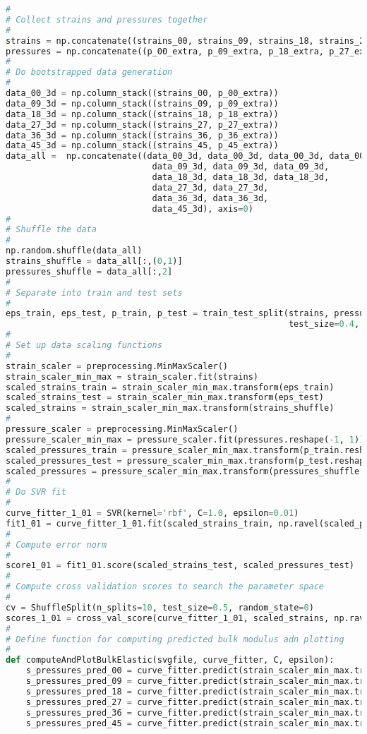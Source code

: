 \begin{lstlisting}[language=Python]
# 
# Collect strains and pressures together
#
strains = np.concatenate((strains_00, strains_09, strains_18, strains_27, strains_36, strains_45), axis=0)
pressures = np.concatenate((p_00_extra, p_09_extra, p_18_extra, p_27_extra, p_36_extra, p_45_extra), axis=0)
#
# Do bootstrapped data generation
#
data_00_3d = np.column_stack((strains_00, p_00_extra))
data_09_3d = np.column_stack((strains_09, p_09_extra))
data_18_3d = np.column_stack((strains_18, p_18_extra))
data_27_3d = np.column_stack((strains_27, p_27_extra))
data_36_3d = np.column_stack((strains_36, p_36_extra))
data_45_3d = np.column_stack((strains_45, p_45_extra))
data_all =  np.concatenate((data_00_3d, data_00_3d, data_00_3d, data_00_3d, 
                             data_09_3d, data_09_3d, data_09_3d, 
                             data_18_3d, data_18_3d, data_18_3d, 
                             data_27_3d, data_27_3d, 
                             data_36_3d, data_36_3d, 
                             data_45_3d), axis=0)          
#
# Shuffle the data
#
np.random.shuffle(data_all)
strains_shuffle = data_all[:,(0,1)]
pressures_shuffle = data_all[:,2]
#
# Separate into train and test sets
#
eps_train, eps_test, p_train, p_test = train_test_split(strains, pressures, 
                                                        test_size=0.4, random_state=0)
#
# Set up data scaling functions
#
strain_scaler = preprocessing.MinMaxScaler()
strain_scaler_min_max = strain_scaler.fit(strains)
scaled_strains_train = strain_scaler_min_max.transform(eps_train)
scaled_strains_test = strain_scaler_min_max.transform(eps_test)
scaled_strains = strain_scaler_min_max.transform(strains_shuffle)
#
pressure_scaler = preprocessing.MinMaxScaler()
pressure_scaler_min_max = pressure_scaler.fit(pressures.reshape(-1, 1))
scaled_pressures_train = pressure_scaler_min_max.transform(p_train.reshape(-1, 1))
scaled_pressures_test = pressure_scaler_min_max.transform(p_test.reshape(-1, 1))
scaled_pressures = pressure_scaler_min_max.transform(pressures_shuffle.reshape(-1, 1))
#
# Do SVR fit
#
curve_fitter_1_01 = SVR(kernel='rbf', C=1.0, epsilon=0.01)
fit1_01 = curve_fitter_1_01.fit(scaled_strains_train, np.ravel(scaled_pressures_train))
#
# Compute error norm
#
score1_01 = fit1_01.score(scaled_strains_test, scaled_pressures_test)
#
# Compute cross validation scores to search the parameter space
#
cv = ShuffleSplit(n_splits=10, test_size=0.5, random_state=0)
scores_1_01 = cross_val_score(curve_fitter_1_01, scaled_strains, np.ravel(scaled_pressures), cv=cv)
#
# Define function for computing predicted bulk modulus adn plotting
#
def computeAndPlotBulkElastic(svgfile, curve_fitter, C, epsilon):
    s_pressures_pred_00 = curve_fitter.predict(strain_scaler_min_max.transform(strains_00))
    s_pressures_pred_09 = curve_fitter.predict(strain_scaler_min_max.transform(strains_09))
    s_pressures_pred_18 = curve_fitter.predict(strain_scaler_min_max.transform(strains_18))
    s_pressures_pred_27 = curve_fitter.predict(strain_scaler_min_max.transform(strains_27))
    s_pressures_pred_36 = curve_fitter.predict(strain_scaler_min_max.transform(strains_36))
    s_pressures_pred_45 = curve_fitter.predict(strain_scaler_min_max.transform(strains_45)) 
    

\end{lstlisting}
